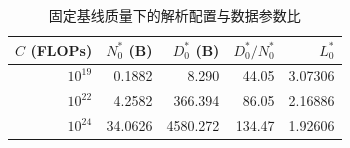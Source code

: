 \begin{table}[!htbp]
\centering
\songti{}
\setlength{\tabcolsep}{4pt}
\caption{固定基线质量下的解析配置与数据参数比}
\label{tab:q3-closed}
\begin{tabular}{rrrrr}
\toprule
$C$ (FLOPs) & $N_0^*$ (B) & $D_0^*$ (B) & $D_0^*/N_0^*$ & $L_0^*$ \\
\midrule
$10^{19}$ & 0.1882 & 8.290 & 44.05 & 3.07306 \\
$10^{22}$ & 4.2582 & 366.394 & 86.05 & 2.16886 \\
$10^{24}$ & 34.0626 & 4580.272 & 134.47 & 1.92606 \\
\bottomrule
\end{tabular}
\end{table}
